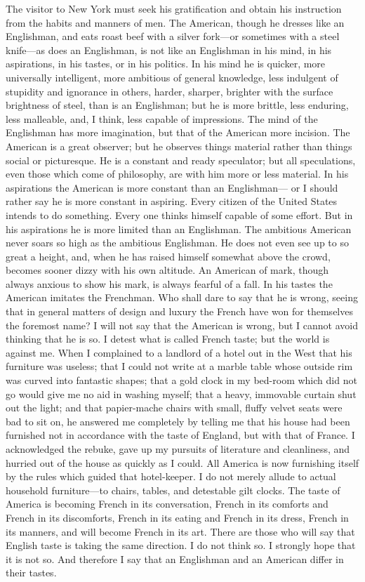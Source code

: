 The visitor to New York must seek his gratification and obtain his
instruction from the habits and manners of men.  The American,
though he dresses like an Englishman, and eats roast beef with a
silver fork---or sometimes with a steel knife---as does an
Englishman, is not like an Englishman in his mind, in his
aspirations, in his tastes, or in his politics.  In his mind he is
quicker, more universally intelligent, more ambitious of general
knowledge, less indulgent of stupidity and ignorance in others,
harder, sharper, brighter with the surface brightness of steel,
than is an Englishman; but he is more brittle, less enduring, less
malleable, and, I think, less capable of impressions.  The mind of
the Englishman has more imagination, but that of the American more
incision.  The American is a great observer; but he observes things
material rather than things social or picturesque.  He is a
constant and ready speculator; but all speculations, even those
which come of philosophy, are with him more or less material.  In
his aspirations the American is more constant than an Englishman---%
or I should rather say he is more constant in aspiring.  Every
citizen of the United States intends to do something.  Every one
thinks himself capable of some effort.  But in his aspirations he
is more limited than an Englishman.  The ambitious American never
soars so high as the ambitious Englishman.  He does not even see up
to so great a height, and, when he has raised himself somewhat
above the crowd, becomes sooner dizzy with his own altitude.  An
American of mark, though always anxious to show his mark, is always
fearful of a fall.  In his tastes the American imitates the
Frenchman.  Who shall dare to say that he is wrong, seeing that in
general matters of design and luxury the French have won for
themselves the foremost name?  I will not say that the American is
wrong, but I cannot avoid thinking that he is so.  I detest what is
called French taste; but the world is against me.  When I
complained to a landlord of a hotel out in the West that his
furniture was useless; that I could not write at a marble table
whose outside rim was curved into fantastic shapes; that a gold
clock in my bed-room which did not go would give me no aid in
washing myself; that a heavy, immovable curtain shut out the light;
and that papier-mache chairs with small, fluffy velvet seats were
bad to sit on, he answered me completely by telling me that his
house had been furnished not in accordance with the taste of
England, but with that of France.  I acknowledged the rebuke, gave
up my pursuits of literature and cleanliness, and hurried out of
the house as quickly as I could.  All America is now furnishing
itself by the rules which guided that hotel-keeper.  I do not
merely allude to actual household furniture---to chairs, tables, and
detestable gilt clocks.  The taste of America is becoming French in
its conversation, French in its comforts and French in its
discomforts, French in its eating and French in its dress, French
in its manners, and will become French in its art.  There are those
who will say that English taste is taking the same direction.  I do
not think so.  I strongly hope that it is not so.  And therefore I
say that an Englishman and an American differ in their tastes.

